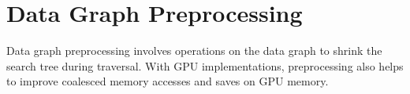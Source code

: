


\section{Data Graph Preprocessing}\label{graph-preprocessing}

Data graph preprocessing involves operations on the data graph to shrink the search tree during traversal.
With GPU implementations, preprocessing also helps to improve coalesced memory accesses and saves on GPU memory.



